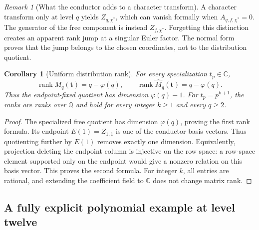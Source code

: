 \documentclass[11pt]{article}
\numberwithin{equation}{section}
\newtheorem{corollary}[theorem]{Corollary}
\theoremstyle{definition}\newtheorem{definition}[theorem]{Definition}
\theoremstyle{remark}\newtheorem{remark}[theorem]{Remark}
\DeclareMathOperator{\rank}{rank}
\newcommand{\Q}{\mathbb Q}\newcommand{\C}{\mathbb C}
\newcommand{\ch}{\chi^*}
\begin{document}
\begin{remark}[What the conductor adds to a character transform]
A character transform only at level $q$ yields $Z_{q,\ch}$, which can
vanish formally when $A_{q,f,\ch}=0$. The generator of the free component
is instead $Z_{f,\ch}$. Forgetting this distinction creates an apparent
rank jump at a singular Euler factor. The normal form proves that the
jump belongs to the chosen coordinates, not to the distribution quotient.
\end{remark}

\begin{corollary}[Uniform distribution rank]\label{cor:rank}
For every specialization $t_p\in\C$,
\begin{equation}\label{eq:allrank}
\rank M_q(\mathbf t)=q-\varphi(q),\qquad
\rank\widehat M_q(\mathbf t)=q-\varphi(q).
\end{equation}
Thus the endpoint-fixed quotient has dimension $\varphi(q)-1$.
For $t_p=p^{k+1}$, the ranks are ranks over $\Q$ and hold for every
integer $k\ge1$ and every $q\ge2$.
\end{corollary}
\begin{proof}
The specialized free quotient has dimension $\varphi(q)$, proving the first
rank formula. Its endpoint $E(1)=Z_{1,1}$ is one of the conductor basis
vectors. Thus quotienting further by $E(1)$ removes exactly one dimension.
Equivalently, projection deleting the endpoint column is injective on the
row space: a row-space element supported only on the endpoint would give
a nonzero relation on this basis vector. This proves the second formula.
For integer $k$, all entries are rational, and extending the coefficient
field to $\C$ does not change matrix rank.
\end{proof}

\subsection{A fully explicit polynomial example at level twelve}
\end{document}
